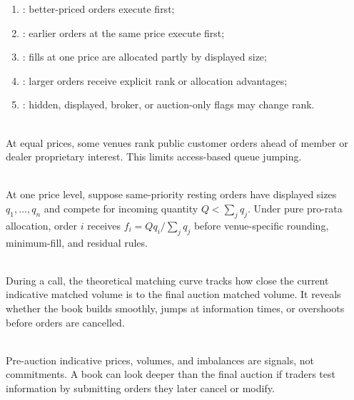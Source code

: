 \documentclass[a4paper,oneside,openany]{book}
\begin{document}
\begin{taxonomy} 
\begin{enumerate}[label=\roman*.]
\setlength{\itemsep}{0pt}
\item {}: better-priced orders execute first;
\item {}: earlier orders at the same price execute first;
\item {}: fills at one price are allocated partly by displayed size;
\item {}: larger orders receive explicit rank or allocation advantages;
\item {}: hidden, displayed, broker, or auction-only flags may change rank.
\end{enumerate}
\end{taxonomy}

\begin{marketrule} \\
At equal prices, some venues rank public customer orders ahead of member or dealer proprietary interest. This limits access-based queue jumping.
\end{marketrule}

\begin{model} \\
At one price level, suppose same-priority resting orders have displayed sizes $q_1,\ldots,q_n$ and compete for incoming quantity $Q<\sum\limits_j q_j$. Under pure pro-rata allocation, order $i$ receives $f_i=Qq_i/\sum\limits_j q_j$ before venue-specific rounding, minimum-fill, and residual rules.
\end{model}

\begin{definition} \\
During a call, the theoretical matching curve tracks how close the current indicative matched volume is to the final auction matched volume. It reveals whether the book builds smoothly, jumps at information times, or overshoots before orders are cancelled.
\end{definition}

\begin{caveat} \\
Pre-auction indicative prices, volumes, and imbalances are signals, not commitments. A book can look deeper than the final auction if traders test information by submitting orders they later cancel or modify.
\end{caveat}
\end{document}
